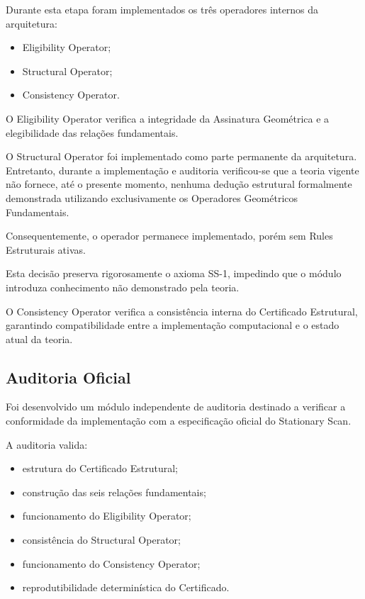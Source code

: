 \documentclass[11pt,a4paper]{article}
\begin{document}
Durante esta etapa foram implementados os três operadores internos da
arquitetura:

\begin{itemize}
\item Eligibility Operator;
\item Structural Operator;
\item Consistency Operator.
\end{itemize}

O Eligibility Operator verifica a integridade da Assinatura Geométrica e a
elegibilidade das relações fundamentais.

O Structural Operator foi implementado como parte permanente da arquitetura.
Entretanto, durante a implementação e auditoria verificou-se que a teoria
vigente não fornece, até o presente momento, nenhuma dedução estrutural
formalmente demonstrada utilizando exclusivamente os Operadores
Geométricos Fundamentais.

Consequentemente, o operador permanece implementado, porém sem Rules
Estruturais ativas.

Esta decisão preserva rigorosamente o axioma SS-1, impedindo que o módulo
introduza conhecimento não demonstrado pela teoria.

O Consistency Operator verifica a consistência interna do Certificado
Estrutural, garantindo compatibilidade entre a implementação computacional
e o estado atual da teoria.

\subsection{Auditoria Oficial}

Foi desenvolvido um módulo independente de auditoria destinado a verificar
a conformidade da implementação com a especificação oficial do
Stationary Scan.

A auditoria valida:

\begin{itemize}
\item estrutura do Certificado Estrutural;
\item construção das seis relações fundamentais;
\item funcionamento do Eligibility Operator;
\item consistência do Structural Operator;
\item funcionamento do Consistency Operator;
\item reprodutibilidade determinística do Certificado.
\end{itemize}
\end{document}
